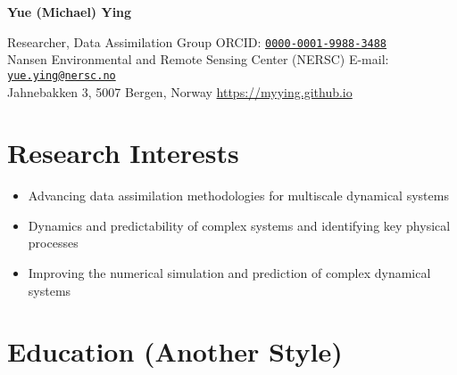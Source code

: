 \documentclass{article}
\newcommand{\cvsection}[1]{\section*{\rmfamily#1}}
\begin{document}
\begin{center}
    \huge{
    \rmfamily
    \textbf{Yue (Michael) Ying}}
\end{center}
\vspace{20pt}



\noindent Researcher, Data Assimilation Group \hfill ORCID: \href{https://orcid.org/0000-0001-9988-3488}{\texttt{0000-0001-9988-3488}} \\
\noindent Nansen Environmental and Remote Sensing Center (NERSC) \hfill E-mail: \href{mailto:yue.ying@nersc.no}{\texttt{yue.ying@nersc.no}} \\
\noindent Jahnebakken 3, 5007 Bergen, Norway \hfill \url{https://myying.github.io}


\cvsection{Research Interests}
\begin{itemize}[leftmargin=2em, topsep=0pt, itemsep=0pt]
    \item Advancing data assimilation methodologies for multiscale dynamical systems
    \item Dynamics and predictability of complex systems and identifying key physical processes
    \item Improving the numerical simulation and prediction of complex dynamical systems
\end{itemize}








\cvsection{Education (Another Style)}


\end{document}
